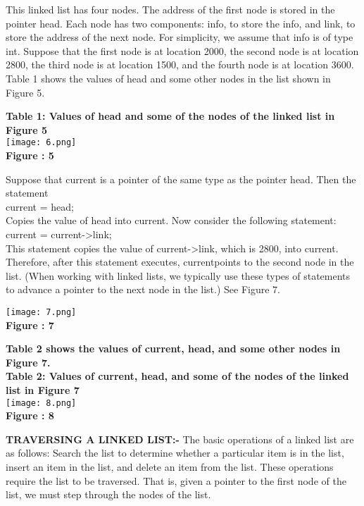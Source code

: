 \documentclass[11pt]{article}            %
\begin{document}
This linked list has four nodes. The address of the first node is stored in the pointer head. Each
node has two components: info, to store the info, and link, to store the address of the next node.
For simplicity, we assume that info is of type int. Suppose that the first node is at location 2000,
the second node is at location 2800, the third node is at location 1500, and the fourth node is at
location 3600. Table 1 shows the values of head and some other nodes in the list shown in Figure
5.\\
\begin{center}
\textbf{Table 1: Values of head and some of the nodes of the linked list in Figure 5}\\
 \texttt{[image: 6.png]}\\ 
\textbf{Figure : 5}
\vskip 0.5cm
\end{center}

Suppose that current is a pointer of the same type as the pointer head. Then the statement\\
current = head;\\
Copies the value of head into current. Now consider the following
statement:\\
current = current->link;\\
This statement copies the value of current->link, which is 2800, into current. Therefore, after
this statement executes, currentpoints to the second node in the list. (When working with
linked lists, we typically use these types of statements to advance a pointer to the next node in
the list.) See Figure 7.\\
\begin{center}
 \texttt{[image: 7.png]}\\ 
\textbf{Figure : 7}
\vskip 0.5cm
\end{center}

\begin{center}
\textbf{Table 2 shows the values of current, head, and some other nodes in Figure 7.\\Table 2: Values of current, head, and some of the nodes of the linked list in Figure 7\\}
 \texttt{[image: 8.png]}\\ 
\textbf{Figure : 8}
\vskip 0.5cm
\end{center}

\textbf{TRAVERSING A LINKED LIST:- }
The basic operations of a linked list are as follows: Search the list to determine whether a
particular item is in the list, insert an item in the list, and delete an item from the list. These
operations require the list to be traversed. That is, given a pointer to the first node of the list,
we must step through the nodes of the list.\\
\end{document}
